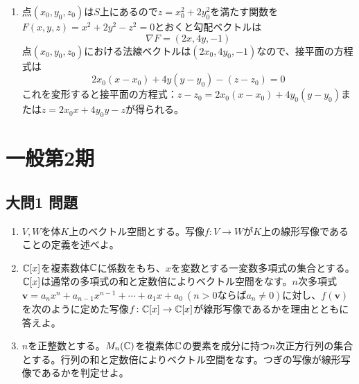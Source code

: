 \documentclass[dvipdfmx]{jsreport}
\begin{document}
\begin{souanswer}
\begin{enumerate}
\begin{align*}
    &= \pi\left[\frac{1}{8}\cdot \frac{2}{3}(1+ 4r^2)^{3/2}\right]_{r= 0}^1\\
    &= \frac{\pi}{12}(5\sqrt{5}- 1)
\end{align*}
    \item 点$(x_0, y_0, z_0)$は$S$上にあるので$z= x_0^2+ 2y_0^2$を満たす関数を$F(x, y, z)= x^2+ 2y^2- z^2= 0$とおくと勾配ベクトルは
\begin{equation*}
    \nabla{F}= (2x, 4y, -1)
\end{equation*}
    点$(x_0, y_0, z_0)$における法線ベクトルは$(2x_0, 4y_0, -1)$なので、接平面の方程式は
\begin{equation*}
    2x_0(x- x_0)+ 4y(y- y_0)- (z- z_0)= 0
\end{equation*}
    これを変形すると接平面の方程式：$z- z_0= 2x_0(x- x_0)+ 4y_0(y- y_0)$または$z= 2x_0x+ 4y_0y- z$が得られる。
\end{enumerate}
\end{souanswer}


\chapter{一般第2期}
\section{大問1 問題}
\begin{tcolorbox} %
\begin{enumerate}
	\item $V, W$を体$K$上のベクトル空間とする。写像$f\colon V\to W$が$K$上の線形写像であることの定義を述べよ。
	\item $\mathbb{C}[x]$を複素数体$\mathbb{C}$に係数をもち、$x$を変数とする一変数多項式の集合とする。$\mathbb{C}[x]$は通常の多項式の和と定数倍によりベクトル空間をなす。$n$次多項式$\bm{v}= a_n x^n+ a_{n- 1}x^{n- 1}+ \cdots+ a_1 x+ a_0\ (n> 0ならばa_n\ne 0)$に対し、$f(\bm{v})$を次のように定めた写像$f\colon \mathbb{C}[x]\to \mathbb{C}[x]$が線形写像であるかを理由とともに答えよ。
	\item $n$を正整数とする。$M_n(\mathbb{C})$を複素体$\mathbb{C}$の要素を成分に持つ$n$次正方行列の集合とする。行列の和と定数倍によりベクトル空間をなす。つぎの写像が線形写像であるかを判定せよ。
\end{enumerate}
\end{tcolorbox}
\end{document}
